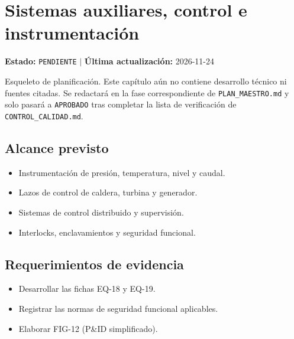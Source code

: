 \chapter{Sistemas auxiliares, control e instrumentación}
\label{cap:10}

\begin{cajaestado}
\textbf{Estado:} \texttt{PENDIENTE} \quad$|$\quad
\textbf{Última actualización:} 2026-11-24

Esqueleto de planificación. Este capítulo aún no contiene desarrollo técnico ni
fuentes citadas. Se redactará en la fase correspondiente de
\texttt{PLAN\_MAESTRO.md} y solo pasará a \texttt{APROBADO} tras completar
la lista de verificación de \texttt{CONTROL\_CALIDAD.md}.
\end{cajaestado}

\section{Alcance previsto}
\begin{itemize}
  \item Instrumentación de presión, temperatura, nivel y caudal.
  \item Lazos de control de caldera, turbina y generador.
  \item Sistemas de control distribuido y supervisión.
  \item Interlocks, enclavamientos y seguridad funcional.
\end{itemize}

\section{Requerimientos de evidencia}
\begin{itemize}
  \item Desarrollar las fichas EQ-18 y EQ-19.
  \item Registrar las normas de seguridad funcional aplicables.
  \item Elaborar FIG-12 (P\&ID simplificado).
\end{itemize}
